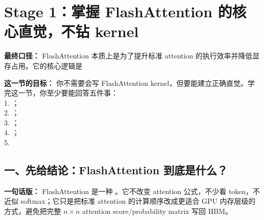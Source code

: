 
\section{Stage 1：掌握 FlashAttention 的核心直觉，不钻 kernel}

\begin{conceptbox}
\textbf{最终口径：} FlashAttention 本质上是为了提升标准 attention 的执行效率并降低显存占用。它的核心逻辑是
\end{conceptbox}

\begin{conceptbox}
\textbf{这一节的目标：} 你不需要会写 FlashAttention kernel，但要能建立正确直觉。学完这一节，你至少要能回答五件事：\\
1. ；\\
2. ；\\
3. ；\\
4. ；\\
5. 
\end{conceptbox}


\subsection{一、先给结论：FlashAttention 到底是什么？}

\begin{conceptbox}
\textbf{一句话版：} FlashAttention 是一种 。它不改变 attention 公式，不少看 token，不近似 softmax；它只是把标准 attention 的计算顺序改成更适合 GPU 内存层级的方式，避免把完整 $n \times n$ attention score/probability matrix 写回 HBM。
\end{conceptbox}

